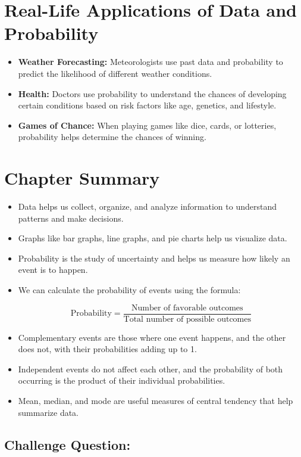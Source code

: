 \section{Real-Life Applications of Data and Probability}
\begin{itemize}
    \item \textbf{Weather Forecasting:} Meteorologists use past data and probability to predict the likelihood of different weather conditions.
    \item \textbf{Health:} Doctors use probability to understand the chances of developing certain conditions based on risk factors like age, genetics, and lifestyle.
    \item \textbf{Games of Chance:} When playing games like dice, cards, or lotteries, probability helps determine the chances of winning.
\end{itemize}

\section{Chapter Summary}
\begin{itemize}
    \item Data helps us collect, organize, and analyze information to understand patterns and make decisions.
    \item Graphs like bar graphs, line graphs, and pie charts help us visualize data.
    \item Probability is the study of uncertainty and helps us measure how likely an event is to happen.
    \item We can calculate the probability of events using the formula: 
    
    \[
    \text{Probability} = \frac{\text{Number of favorable outcomes}}{\text{Total number of possible outcomes}}
    \]
    
    \item Complementary events are those where one event happens, and the other does not, with their probabilities adding up to 1.
    \item Independent events do not affect each other, and the probability of both occurring is the product of their individual probabilities.
    \item Mean, median, and mode are useful measures of central tendency that help summarize data.
\end{itemize}

\subsection{Challenge Question:}

